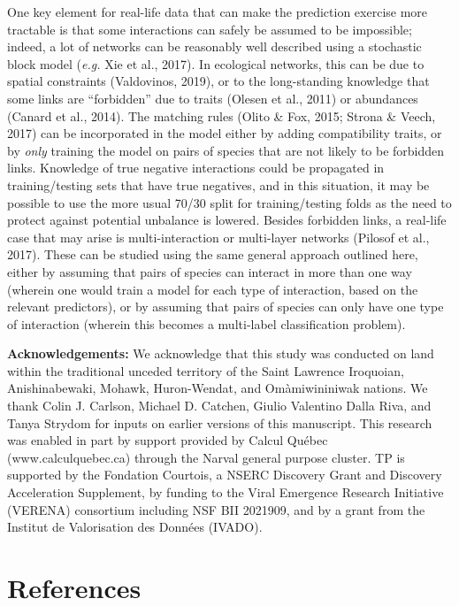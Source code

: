 \documentclass[11pt]{article}
\begin{document}
One key element for real-life data that can make the prediction exercise
more tractable is that some interactions can safely be assumed to be
impossible; indeed, a lot of networks can be reasonably well described
using a stochastic block model (\emph{e.g.} Xie et al., 2017). In
ecological networks, this can be due to spatial constraints (Valdovinos,
2019), or to the long-standing knowledge that some links are
``forbidden'' due to traits (Olesen et al., 2011) or abundances (Canard
et al., 2014). The matching rules (Olito \& Fox, 2015; Strona \& Veech,
2017) can be incorporated in the model either by adding compatibility
traits, or by \emph{only} training the model on pairs of species that
are not likely to be forbidden links. Knowledge of true negative
interactions could be propagated in training/testing sets that have true
negatives, and in this situation, it may be possible to use the more
usual 70/30 split for training/testing folds as the need to protect
against potential unbalance is lowered. Besides forbidden links, a
real-life case that may arise is multi-interaction or multi-layer
networks (Pilosof et al., 2017). These can be studied using the same
general approach outlined here, either by assuming that pairs of species
can interact in more than one way (wherein one would train a model for
each type of interaction, based on the relevant predictors), or by
assuming that pairs of species can only have one type of interaction
(wherein this becomes a multi-label classification problem).

\textbf{Acknowledgements:} We acknowledge that this study was conducted
on land within the traditional unceded territory of the Saint Lawrence
Iroquoian, Anishinabewaki, Mohawk, Huron-Wendat, and Omàmiwininiwak
nations. We thank Colin J. Carlson, Michael D. Catchen, Giulio Valentino
Dalla Riva, and Tanya Strydom for inputs on earlier versions of this
manuscript. This research was enabled in part by support provided by
Calcul Québec (www.calculquebec.ca) through the Narval general purpose
cluster. TP is supported by the Fondation Courtois, a NSERC Discovery
Grant and Discovery Acceleration Supplement, by funding to the Viral
Emergence Research Initiative (VERENA) consortium including NSF BII
2021909, and by a grant from the Institut de Valorisation des Données
(IVADO).

\hypertarget{references}{%
\section*{References}\label{references}}
\end{document}
